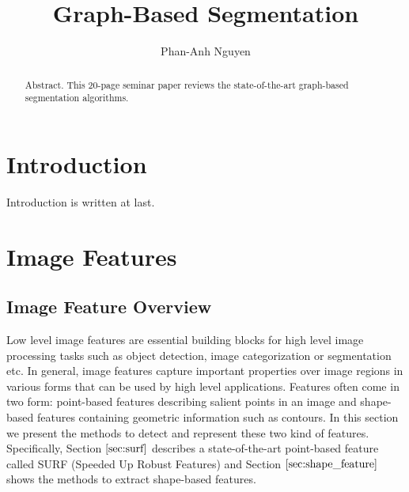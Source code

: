 \documentclass{SMBV12}
\begin{document}
\title{Graph-Based Segmentation}

\author{Phan-Anh Nguyen}

\maketitle


\begin{abstract}%
Abstract. This 20-page seminar paper reviews the state-of-the-art graph-based segmentation algorithms.
\end{abstract}



%
\section{Introduction}

Introduction is written at last.

%
\section{Image Features}

\subsection{Image Feature Overview}
Low level image features are essential building blocks for high level image processing tasks such as object detection, image categorization or segmentation etc. In general, image features capture important properties over image regions in various forms that can be used by high level applications. Features often come in two form: point-based features describing salient points in an image and shape-based features containing geometric information such as contours. In this section we present the methods to detect and represent these two kind of features. Specifically, Section $\ref{sec:surf}$ describes a state-of-the-art point-based feature called SURF (Speeded Up Robust Features) \cite{bay2006surf} and Section $\ref{sec:shape_feature}$ shows the methods to extract shape-based features.
\end{document}
